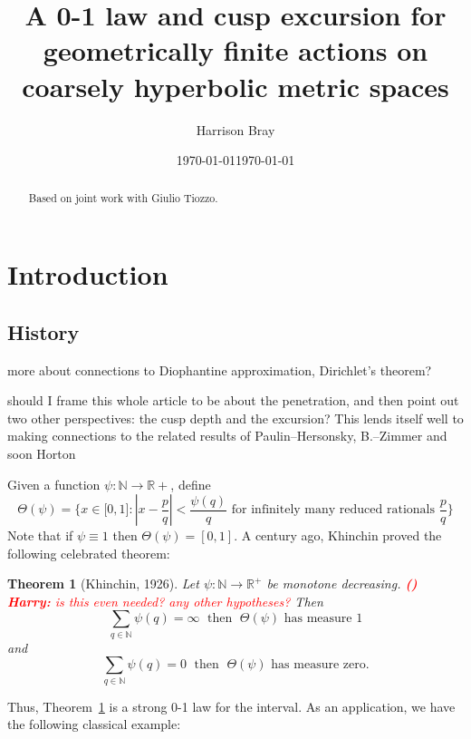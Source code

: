 \documentclass[11pt]{amsart}
\date{\today}
\theoremstyle{plain}
\newtheorem{theorem}[proposition]{Theorem}
\theoremstyle{definition}
\theoremstyle{remark}
\newcounter{countharry}
\newcommand{\comharry}[1]{{\textcolor{red}{\textrm{{\bf (\arabic{countharry})\stepcounter{countharry} Harry:} #1}}}}
\begin{document}
\title[A 0-1 law for hyperbolic metric spaces]{
  A 0-1 law and cusp excursion for geometrically finite actions on coarsely
  hyperbolic metric spaces
}
\author{Harrison Bray}
\date{\today}
\keywords{}
\subjclass[2020]{}

\begin{abstract} 
  Based on joint work with Giulio Tiozzo.
\end{abstract}

\maketitle

\tableofcontents

\section{Introduction}


\subsection{History}

{\color{red} more about connections to Diophantine approximation,
Dirichlet's theorem?}

{\color{red} should I frame this whole article to be about the penetration,
  and then point out two other perspectives: the cusp depth and the
  excursion? This lends itself well to making connections to the related
  results of Paulin--Hersonsky, B.--Zimmer and soon Horton
}



Given a function $\psi\colon\mathbb N\to \mathbb R+$, define
\[ 
  \Theta(\psi)=\{x\in\mathbb [0,1] : |x-\frac{p}q|<\frac{\psi(q)}q
  \text{ for infinitely many reduced rationals }\frac{p}q \}
\]
Note that if $\psi\equiv 1$ then $\Theta(\psi)=[0,1]$. A century ago,
Khinchin proved the following celebrated theorem: 

\begin{theorem}[Khinchin, 1926]
  Let $\psi\colon \mathbb N\to\mathbb R^+$ be monotone decreasing.
  \comharry{is this even needed? any other hypotheses?}
  Then 
  \[
    \sum_{q\in\mathbb N} \psi(q)=\infty \; \text{ then }\; \Theta(\psi)
    \text{ has measure 1}
  \]
  and 
  \[
    \sum_{q\in\mathbb N} \psi(q)=0 \; \text{ then }\; \Theta(\psi)
    \text{ has measure zero}.
  \]
  \label{thm:khinchin}
\end{theorem}

Thus, Theorem~\ref{thm:khinchin} is a strong 0-1 law for the interval. As
an application, we have the following classical example: 
\end{document}

